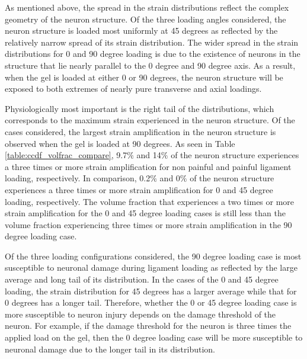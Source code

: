 \documentclass[]{interact}
\begin{document}
As mentioned above, the spread in the strain distributions reflect the complex geometry of the neuron structure. Of the three loading angles considered, the neuron structure is loaded most uniformly at 45 degrees as reflected by the relatively narrow spread of its strain distribution. The wider spread in the strain distributions for 0 and 90 degree loading is due to the existence of neurons in the structure that lie nearly parallel to the 0 degree and 90 degree axis. As a result, when the gel is loaded at either 0 or 90 degrees, the neuron structure will be exposed to both extremes of nearly pure transverse and axial loadings. 

Physiologically most important is the right tail of the distributions, which corresponds to the maximum strain experienced in the neuron structure. Of the cases considered, the largest strain amplification in the neuron structure is observed when the gel is loaded at 90 degrees. As seen in Table \ref{table:ccdf_volfrac_compare}, 9.7$\%$ and 14$\%$ of the neuron structure experiences a three times or more strain amplification for non painful and painful ligament loading, respectively. In comparison,  0.2$\%$  and 0$\%$ of the neuron structure experiences a three times or more strain amplification for 0 and 45 degree loading, respectively. The volume fraction that experiences a two times or more strain amplification for the 0 and 45 degree loading cases is still less than the volume fraction experiencing three times or more strain amplification in the 90 degree loading case.

Of the three loading configurations considered, the 90 degree loading case is most susceptible to neuronal damage during ligament loading as reflected by the large average and long tail of its distribution. In the cases of the 0 and 45 degree loading, the strain distribution for 45 degrees has a larger average while that for 0 degrees has a longer tail. Therefore, whether the 0 or 45 degree loading case is more susceptible to neuron injury depends on the damage threshold of the neuron. For example, if the damage threshold for the neuron is three times the applied load on the gel, then the 0 degree loading case will be more susceptible to neuronal damage due to the longer tail in its distribution.
\end{document}
